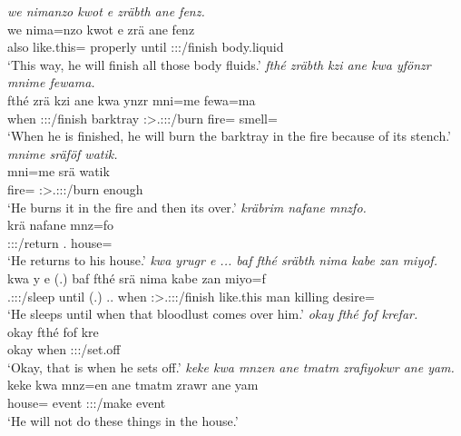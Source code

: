 \begin{exe}
	\emph{we nimanzo kwot e zräbth ane fenz.}\\
	\gll we nima=nzo kwot e zrä ane fenz\\
	also like.this={\Only} properly until \Stsg:\Sbj:\Irr:\Pfv/finish {\Dem} body.liquid\\
	\trans `This way, he will finish all those body fluids.'
	\emph{fthé zräbth kzi ane kwa yfönzr mnime fewama.}\\
	\gll fthé zrä kzi ane kwa ynzr mni=me fewa=ma\\
	when \Stsg:\Sbj:\Irr:\Pfv/finish barktray {\Dem} {\Fut} \Stsg:\Sbj>\Tsg.\Masc:\Obj:\Nonpast:\Ipfv/burn fire={\Ins} smell=\Char\\
	\trans `When he is finished, he will burn the barktray in the fire because of its stench.'
	\emph{mnime sräföf watik.}\\
	\gll mni=me srä watik\\
	fire={\Ins} \Stsg:\Sbj>\Tsg.\Masc:\Obj:\Irr:\Pfv/burn enough\\
	\trans `He burns it in the fire and then its over.'
	\emph{kräbrim nafane mnzfo.}\\
	\gll krä nafane mnz=fo\\
	\Stsg:\Sbj:\Irr:\Pfv/return \Tsg.{\Poss} house={\Loc}\\
	\trans `He returns to his house.'
	\emph{kwa yrugr e ... baf fthé sräbth nima kabe zan miyof.}\\
	\gll kwa y e (.) baf fthé srä nima kabe zan miyo=f\\
	{\Fut} \Tsg.\Masc:\Sbj:\Nonpast:\Ipfv/sleep until (.) \Recog.\Erg.{\Sg} when \Stsg:\Sbj>\Tsg.\Masc:\Obj:\Irr:\Pfv/finish like.this man killing desire=\Erg\\
	\trans `He sleeps until when that bloodlust comes over him.'
	\emph{okay fthé fof krefar.}\\
	\gll okay fthé fof kre\\
	okay when {\Emph} \Stsg:\Sbj:\Irr:\Pfv/set.off\\
	\trans `Okay, that is when he sets off.'
	\emph{keke kwa mnzen ane tmatm zrafiyokwr ane yam.}\\
	\gll keke kwa mnz=en ane tmatm zrawr ane yam\\
	{\Neg} {\Fut} house={\Loc} {\Dem} event \Stsg:\Sbj:\Irr:\Ipfv/make {\Dem} event\\
	\trans `He will not do these things in the house.'

\end{exe}
